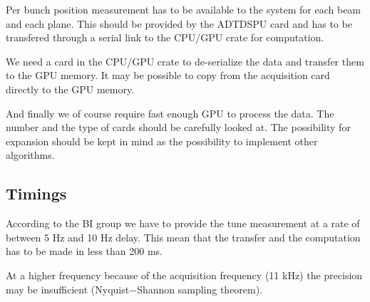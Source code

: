    Per bunch position measurement has to be available to the system for each beam and each plane. This should be provided by the \gls{ADTDSPU} card and has to be transfered through a serial link to the CPU/GPU crate for computation.

   We need a card in the CPU/GPU crate to de-serialize the data and transfer them to the GPU memory. It may be possible to copy from the acquisition card directly to the GPU memory.

   And finally we of course require fast enough GPU to process the data. The number and the type of cards should be carefully looked at. The possibility for expansion should be kept in mind as the possibility to implement other algorithms.
   
   \subsection{Timings}

   According to the \gls{BI} group we have to provide the tune measurement at a rate of between 5 Hz and 10 Hz delay. This mean that the transfer and the computation has to be made in less than 200 ms.

   At a higher frequency because of the acquisition frequency (11 kHz) the precision may be insufficient (Nyquist$-$Shannon sampling theorem).